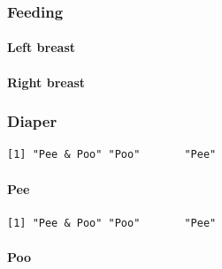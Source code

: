 \documentclass[10,portrait]{article}
\newenvironment{Shaded}{\begin{snugshade}}{\end{snugshade}}
\newcommand{\KeywordTok}[1]{\textcolor[rgb]{0.13,0.29,0.53}{\textbf{#1}}}
\newcommand{\OperatorTok}[1]{\textcolor[rgb]{0.81,0.36,0.00}{\textbf{#1}}}
\newcommand{\NormalTok}[1]{#1}
\let\oldparagraph\paragraph
\renewcommand{\paragraph}[1]{\oldparagraph{#1}\mbox{}}
\begin{document}
\subsubsection{Feeding}\label{feeding}

\paragraph{Left breast}\label{left-breast}

\paragraph{Right breast}\label{right-breast}

\subsubsection{Diaper}\label{diaper}

\begin{Shaded}
\end{Shaded}

\begin{verbatim}
[1] "Pee & Poo" "Poo"       "Pee"      
\end{verbatim}

\paragraph{Pee}\label{pee}

\begin{Shaded}
\end{Shaded}

\begin{verbatim}
[1] "Pee & Poo" "Poo"       "Pee"      
\end{verbatim}

\paragraph{Poo}\label{poo}

\begin{Shaded}
\end{Shaded}
\end{document}

